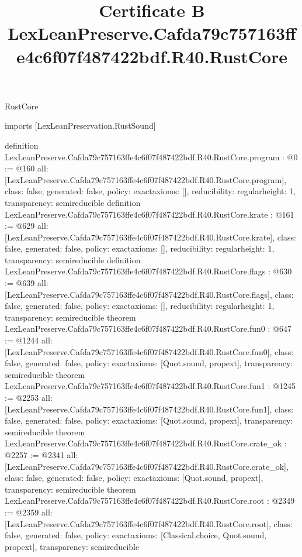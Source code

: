 \begin{lexlean}{RustCore}
\title{Certificate B LexLeanPreserve.Cafda79c757163ffe4c6f07f487422bdf.R40.RustCore}
\begin{coremodule}
imports [LexLeanPreservation.RustSound]

definition LexLeanPreserve.Cafda79c757163ffe4c6f07f487422bdf.R40.RustCore.program : @0 := @160 {
  all: [LexLeanPreserve.Cafda79c757163ffe4c6f07f487422bdf.R40.RustCore.program],
  class: false,
  generated: false,
  policy: exact{axioms: []},
  reducibility: regular{height: 1},
  transparency: semireducible
}
definition LexLeanPreserve.Cafda79c757163ffe4c6f07f487422bdf.R40.RustCore.krate : @161 := @629 {
  all: [LexLeanPreserve.Cafda79c757163ffe4c6f07f487422bdf.R40.RustCore.krate],
  class: false,
  generated: false,
  policy: exact{axioms: []},
  reducibility: regular{height: 1},
  transparency: semireducible
}
definition LexLeanPreserve.Cafda79c757163ffe4c6f07f487422bdf.R40.RustCore.flags : @630 := @639 {
  all: [LexLeanPreserve.Cafda79c757163ffe4c6f07f487422bdf.R40.RustCore.flags],
  class: false,
  generated: false,
  policy: exact{axioms: []},
  reducibility: regular{height: 1},
  transparency: semireducible
}
theorem LexLeanPreserve.Cafda79c757163ffe4c6f07f487422bdf.R40.RustCore.fun0 : @647 := @1244 {
  all: [LexLeanPreserve.Cafda79c757163ffe4c6f07f487422bdf.R40.RustCore.fun0],
  class: false,
  generated: false,
  policy: exact{axioms: [Quot.sound, propext]},
  transparency: semireducible
}
theorem LexLeanPreserve.Cafda79c757163ffe4c6f07f487422bdf.R40.RustCore.fun1 : @1245 := @2253 {
  all: [LexLeanPreserve.Cafda79c757163ffe4c6f07f487422bdf.R40.RustCore.fun1],
  class: false,
  generated: false,
  policy: exact{axioms: [Quot.sound, propext]},
  transparency: semireducible
}
theorem LexLeanPreserve.Cafda79c757163ffe4c6f07f487422bdf.R40.RustCore.crate_ok : @2257 := @2341 {
  all: [LexLeanPreserve.Cafda79c757163ffe4c6f07f487422bdf.R40.RustCore.crate_ok],
  class: false,
  generated: false,
  policy: exact{axioms: [Quot.sound, propext]},
  transparency: semireducible
}
theorem LexLeanPreserve.Cafda79c757163ffe4c6f07f487422bdf.R40.RustCore.root : @2349 := @2359 {
  all: [LexLeanPreserve.Cafda79c757163ffe4c6f07f487422bdf.R40.RustCore.root],
  class: false,
  generated: false,
  policy: exact{axioms: [Classical.choice, Quot.sound, propext]},
  transparency: semireducible
}


\end{coremodule}
\end{lexlean}
